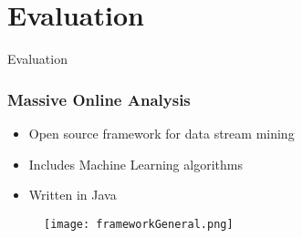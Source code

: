 \section{Evaluation}

\begin{frame}
        \centering
        \huge Evaluation
\end{frame}

\begin{frame}
	\frametitle{Massive Online Analysis}
	\begin{itemize}
		\item Open source framework for data stream mining
		\item Includes Machine Learning algorithms
		\item Written in Java
	\end{itemize}
	\begin{figure}
		\centering
		\texttt{[image: frameworkGeneral.png]}
	\end{figure}
\end{frame}

